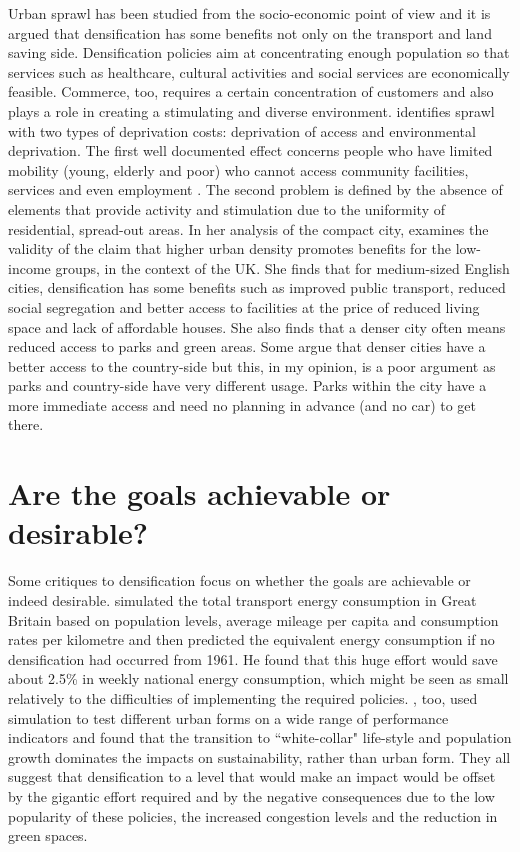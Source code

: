 \documentclass [a4paper,12pt]{article} %
\begin{document}
Urban sprawl has been studied from the socio-economic point of view and it is argued that densification has some benefits not only on the transport and land saving side. Densification policies aim at concentrating enough population so that services such as healthcare, cultural activities and social services are economically feasible. Commerce, too, requires a certain concentration of customers and also plays a role in creating a stimulating and diverse environment. 
\cite{popenoe1979urban} identifies sprawl with two types of deprivation costs: deprivation of access and environmental deprivation. The first well documented effect concerns people who have limited mobility (young, elderly and poor) who cannot access community facilities, services and even employment \citep{burchell1993demographic, newman1996reducing}. The second problem is defined by the absence of elements that provide activity and stimulation due to the uniformity of residential, spread-out areas. 
In her analysis of the compact city, \cite{Burton2000} examines the validity of the claim that higher urban density promotes benefits for the low-income groups, in the context of the UK. She finds that for medium-sized English cities, densification has some benefits such as improved public transport, reduced social segregation and better access to facilities at the price of reduced living space and lack of affordable houses. She also finds that a denser city often means reduced access to parks and green areas. Some argue that denser cities have a better access to the country-side but this, in my opinion, is a poor argument as parks and country-side have very different usage. Parks within the city have a more immediate access and need no planning in advance (and no car) to get there. 


\section*{Are the goals achievable or desirable?}

Some critiques to densification focus on whether the goals are achievable or indeed desirable. \cite{breheny1995compact} simulated the total transport energy consumption in Great Britain based on population levels, average mileage per capita and consumption rates per kilometre and then predicted the equivalent energy consumption if no densification had occurred from 1961. He found that this huge effort would save about 2.5\% in weekly national energy consumption, which might be seen as small relatively to the difficulties of implementing the required policies. \cite{Echenique2012}, too, used simulation to test different urban forms on a wide range of performance indicators and found that the transition to ``white-collar" life-style and population growth dominates the impacts on sustainability, rather than urban form. They all suggest that densification to a level that would make an impact would be offset by the gigantic effort required and by the negative consequences due to the low popularity of these policies, the increased congestion levels and the reduction in green spaces.
\end{document}
